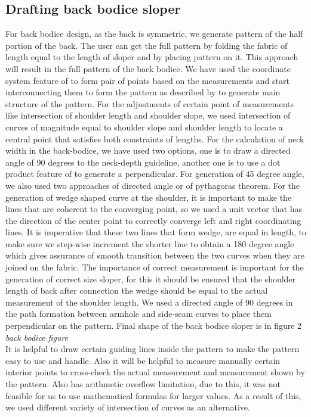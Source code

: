 \documentclass[10pt,letterpaper]{ltugboat}
\begin{document}
\subsection{Drafting back bodice sloper}
For back bodice design, as the back is symmetric, we generate pattern of the half portion of the back. The user can get the full pattern by folding the fabric of length equal to the length of sloper and by placing pattern on it. This approach will result in the full pattern of the back bodice. We have used the coordinate system feature of \MP{} to form pair of points based on the measurements and start interconnecting them to form the pattern as described by \cite{maddie} to generate main structure of the pattern. For the adjustments of certain point of measurements like intersection of shoulder length and shoulder slope, we used intersection of curves of magnitude equal to shoulder slope and shoulder length to locate a central point that satisfies both constraints of lengths. For the calculation of neck width in the back-bodice, we have used two options, one is to draw a directed angle of 90 degrees to the neck-depth guideline, another one is to use a dot product feature of \MP{} to generate a perpendicular. For generation of 45 degree angle, we also used two approaches of directed angle or of pythagoras theorem. For the generation of wedge shaped curve at the shoulder, it is important to make the lines that are coherent to the converging point, so we used a unit vector that has the direction of the center point to correctly converge left and right coordinating lines. It is imperative that these two lines that form wedge, are equal in length, to make sure we step-wise increment the shorter line to obtain a 180 degree angle which gives assurance of smooth transition between the two curves when they are joined on the fabric. The importance of correct measurement is important for the generation of correct size sloper, for this it should be ensured that the shoulder length of back after connection the wedge should be equal to the actual measurement of the shoulder length. We used a directed angle of 90 degrees in the path formation between armhole and side-seam curves to place them perpendicular on the pattern. Final shape of the back bodice sloper is in figure 2 \textit{back bodice figure}
\\It is helpful to draw certain guiding lines inside the pattern to make the pattern easy to use and handle. Also it will be helpful to measure manually certain interior points to cross-check the actual measurement and measurement shown by the pattern. Also \MP{} has arithmetic overflow limitation, due to this, it was not feasible for us to use mathematical formulas for larger values. As a result of this, we used different variety of intersection of curves as an alternative.
\end{document}
